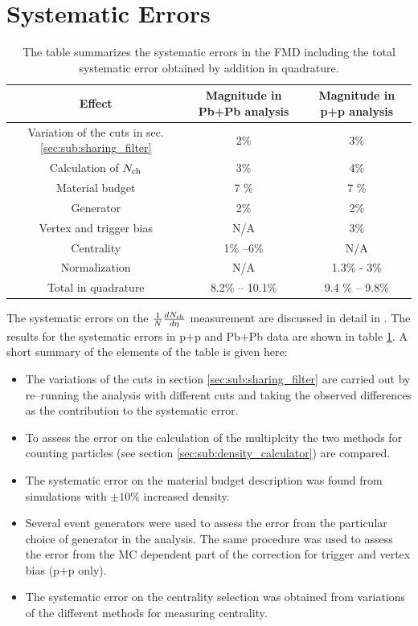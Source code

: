 \documentclass[11pt]{article}
\begin{document}
\section{Systematic Errors} \label{fmdsysterror} 
\begin{table} 
\centering
\begin{tabular}{|c|c|c|}
\hline
 Effect & Magnitude in Pb+Pb analysis & Magnitude in p+p
 analysis \\
\hline
 Variation of the cuts in sec. \ref{sec:sub:sharing_filter} & 2\%   &  3\% \\
\hline
Calculation of $N_{\text{ch}}$ & 3\%   &  4\% \\
\hline
 Material budget   & 7 \%  & 7 \%  \\
\hline
 Generator    & 2\%  & 2\%   \\
\hline
Vertex and trigger bias    & N/A  &  3\%  \\
\hline
 Centrality   & 1\% --6\%   & N/A  \\
\hline
 Normalization   & N/A  &  1.3\% - 3\% \\
\hline
\hline
Total in quadrature & 8.2\% -- 10.1\% & 9.4 \% -- 9.8\% \\
\hline
\end{tabular}
\caption[Systematic Errors in the FMD]{The table summarizes the
  systematic errors in the FMD including the total systematic error
  obtained by addition in quadrature.} \label{systerrors} 
\end{table}
The systematic errors on the $\dndeta$ measurement are discussed in detail in 
\cite{hhd:2009}. The results for the systematic errors in p+p and
Pb+Pb data are shown in table \ref{systerrors}. A short summary of the elements of the table is given here:
\begin{itemize}
\item The variations of the cuts in section \ref{sec:sub:sharing_filter} are carried out by re--running the analysis with different cuts and taking the observed differences as the contribution to the systematic error.
\item To assess the error on the calculation of the multiplcity the two methods for counting particles (see section \ref{sec:sub:density_calculator}) are compared.
\item The systematic error on the material budget description was found from simulations with $\pm 10 \%$ increased density.
\item Several event generators were used to assess the error from the particular choice of generator in the analysis. The same procedure was used to assess the error from the MC dependent part of the correction for trigger and vertex bias (p+p only). 
\item The systematic error on the centrality selection was obtained from variations of the different methods for measuring centrality. 
\end{itemize}
\end{document}

